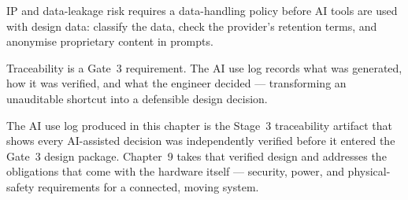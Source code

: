 IP and data-leakage risk requires a data-handling policy before AI tools are
used with design data: classify the data, check the provider's retention terms,
and anonymise proprietary content in prompts.

Traceability is a Gate~3 requirement.
The AI use log records what was generated, how it was verified, and what the
engineer decided --- transforming an unauditable shortcut into a defensible
design decision.

The AI use log produced in this chapter is the Stage~3 traceability artifact
that shows every AI-assisted decision was independently verified before it
entered the Gate~3 design package.
Chapter~9 takes that verified design and addresses the obligations that come
with the hardware itself --- security, power, and physical-safety requirements
for a connected, moving system.

